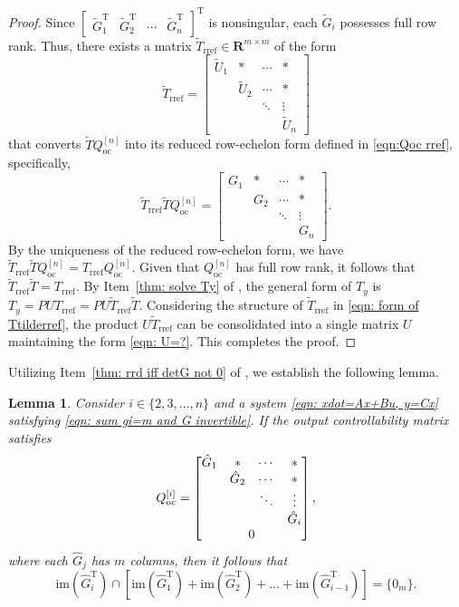\documentclass[sort&compress]{elsarticle}
\newtheorem{lemma}{Lemma}
\newcommand\Qoc{Q_\mathrm{oc}}
\newcommand\im{\mathrm{im}}
\newcommand\R{\mathbf R}
\newcommand\T{\mathrm T}
\begin{document}
\begin{proof}
Since $\begin{bmatrix} \tilde G_1^\T & \tilde G_2^\T & \cdots & \tilde G_n^\T \end{bmatrix}^\T$ is nonsingular,
each $\tilde G_i$ possesses full row rank.
Thus, there exists a matrix $\tilde T_\mathrm{rref} \in \R^{m \times m}$ of the form
\begin{equation}\label{eqn: form of Ttilderref}
\tilde T_\mathrm{rref} = \begin{bmatrix}
\tilde U_1 & * & \cdots & * \\
& \tilde U_2 & \cdots & * \\
& & \ddots & \vdots \\
& & & \tilde U_{n}
\end{bmatrix}
\end{equation}
that converts $\tilde T \Qoc^{[n]}$ into its reduced row-echelon form defined in \eqref{eqn:Qoc rref}, specifically,
\begin{equation*}
\tilde T_\mathrm{rref} \tilde T \Qoc^{[n]} = \begin{bmatrix}
G_1 & * & \cdots & * \\
& G_2 & \cdots & * \\
& & \ddots & \vdots \\
& & & G_n
\end{bmatrix}.
\end{equation*}
By the uniqueness of the reduced row-echelon form,
we have $\tilde T_\mathrm{rref} \tilde T \Qoc^{[n]} = T_\mathrm{rref} \Qoc^{[n]}$.
Given that $\Qoc^{[n]}$ has full row rank,
it follows that $\tilde T_\mathrm{rref} \tilde T = T_\mathrm{rref}$.
By Item~\ref{thm: solve Ty} of , the general form of $T_y$ is
$T_y = PUT_\mathrm{rref} = PU\tilde T_\mathrm{rref}\tilde T$.
Considering the structure of $\tilde T_\mathrm{rref}$ in \eqref{eqn: form of Ttilderref},
the product $U\tilde T_\mathrm{rref}$ can be consolidated into a single matrix $U$
maintaining the form \eqref{eqn: U=?}.
This completes the proof.
\end{proof}

Utilizing Item~\ref{thm: rrd iff detG not 0} of ,
we establish the following lemma.

\begin{lemma}\label{thm: image cap=0}
Consider $i \in \{2, 3, \dots, n\}$ and a system \eqref{eqn: xdot=Ax+Bu, y=Cx}
satisfying \eqref{eqn: sum gi=m and G invertible}.
If the output controllability matrix satisfies
\[
\Qoc^{[i]} = \begin{bmatrix}
\hat G_1 & * & \cdots & * \\
& \hat G_2 & \cdots & * \\
& & \ddots & \vdots \\
& & & \hat G_i \\
\multicolumn{4}{c}{0}
\end{bmatrix},
\]
where each $\hat G_j$ has $m$ columns, then it follows that
\[
\im(\hat G_i^\T) \cap \left[ \im(\hat G_1^\T) + \im(\hat G_2^\T) + \dots + \im(\hat G_{i-1}^\T) \right] = \{0_m\}.
\]
\end{lemma}
\end{document}
